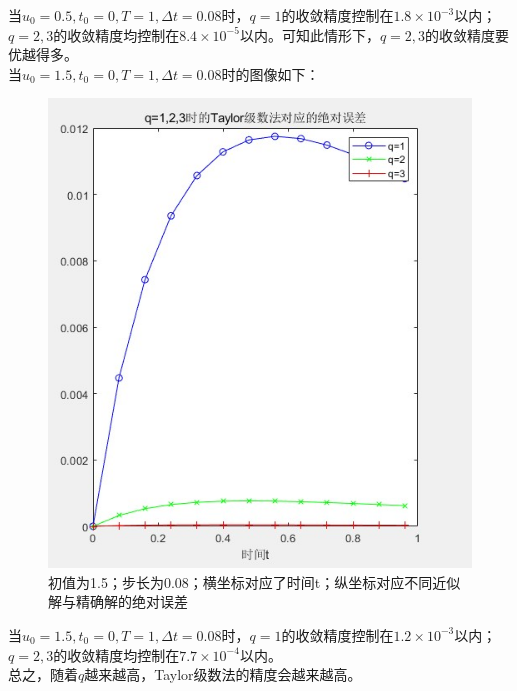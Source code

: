 \documentclass[12pt]{article}
\begin{document}
\noindent 当$u_0=0.5,t_0=0,T=1,\Delta{t}=0.08$时，$q=1$的收敛精度控制在$1.8\times10^{-3}$以内；$q=2,3$的收敛精度均控制在$8.4\times10^{-5}$以内。可知此情形下，$q=2,3$的收敛精度要优越得多。\\
当$u_0=1.5,t_0=0,T=1,\Delta{t}=0.08$时的图像如下：
\begin{figure}[H]
	\centering
	\includegraphics[width=1\textwidth]{4}
	\caption{初值为1.5；步长为0.08；横坐标对应了时间t；纵坐标对应不同近似解与精确解的绝对误差}
\end{figure}
\noindent
当$u_0=1.5,t_0=0,T=1,\Delta{t}=0.08$时，$q=1$的收敛精度控制在$1.2\times10^{-3}$以内；$q=2,3$的收敛精度均控制在$7.7\times10^{-4}$以内。\\
总之，随着$q$越来越高，Taylor级数法的精度会越来越高。
\end{document}
